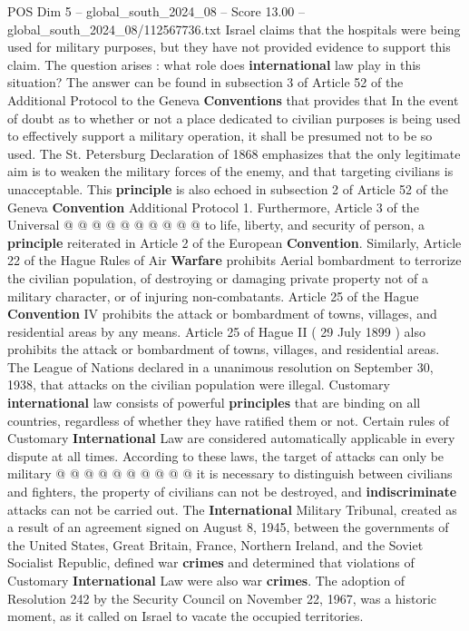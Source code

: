 \begin{textsample}{POS Dim 5 – global\_south\_2024\_08 – Score 13.00 – global\_south\_2024\_08/112567736.txt}
Israel claims that the hospitals were being used for military purposes, but they have not provided evidence to support this claim.
The question arises : what role does \textbf{international} law play in this situation?
The answer can be found in subsection 3 of Article 52 of the Additional Protocol to the Geneva \textbf{Conventions} that provides that In the event of doubt as to whether or not a place dedicated to civilian purposes is being used to effectively support a military operation, it shall be presumed not to be so used.
The St.
Petersburg Declaration of 1868 emphasizes that the only legitimate aim is to weaken the military forces of the enemy, and that targeting civilians is unacceptable.
This \textbf{principle} is also echoed in subsection 2 of Article 52 of the Geneva \textbf{Convention} Additional Protocol 1.
Furthermore, Article 3 of the Universal @ @ @ @ @ @ @ @ @ @ to life, liberty, and security of person, a \textbf{principle} reiterated in Article 2 of the European \textbf{Convention}.
Similarly, Article 22 of the Hague Rules of Air \textbf{Warfare} prohibits Aerial bombardment to terrorize the civilian population, of destroying or damaging private property not of a military character, or of injuring non-combatants.
Article 25 of the Hague \textbf{Convention} IV prohibits the attack or bombardment of towns, villages, and residential areas by any means.
Article 25 of Hague II ( 29 July 1899 ) also prohibits the attack or bombardment of towns, villages, and residential areas.
The League of Nations declared in a unanimous resolution on September 30, 1938, that attacks on the civilian population were illegal.
Customary \textbf{international} law consists of powerful \textbf{principles} that are binding on all countries, regardless of whether they have ratified them or not.
Certain rules of Customary \textbf{International} Law are considered automatically applicable in every dispute at all times.
According to these laws, the target of attacks can only be military @ @ @ @ @ @ @ @ @ @ it is necessary to distinguish between civilians and fighters, the property of civilians can not be destroyed, and \textbf{indiscriminate} attacks can not be carried out.
The \textbf{International} Military Tribunal, created as a result of an agreement signed on August 8, 1945, between the governments of the United States, Great Britain, France, Northern Ireland, and the Soviet Socialist Republic, defined war \textbf{crimes} and determined that violations of Customary \textbf{International} Law were also war \textbf{crimes}.
The adoption of Resolution 242 by the Security Council on November 22, 1967, was a historic moment, as it called on Israel to vacate the occupied territories.

\end{textsample}
